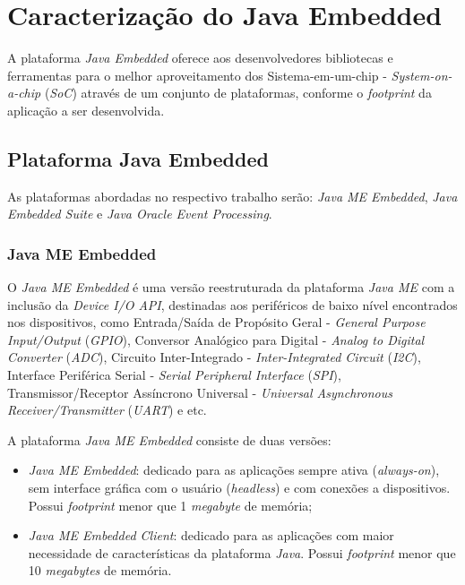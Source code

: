 %

\chapter{Caracterização do Java Embedded}

A plataforma \textit{Java Embedded} oferece aos desenvolvedores bibliotecas e 
ferramentas para o melhor aproveitamento dos Sistema-em-um-chip - 
\textit{System-on-a-chip} (\textit{SoC}) através de um conjunto de plataformas, 
conforme o \textit{footprint} da aplicação a ser desenvolvida.

\section{Plataforma Java Embedded}

As plataformas abordadas no respectivo trabalho serão: \textit{Java ME 
Embedded}, \textit{Java Embedded Suite} e \textit{Java Oracle Event Processing}.

\subsection{Java ME Embedded}

O \textit{Java ME Embedded} é uma versão reestruturada da plataforma 
\textit{Java ME} com a inclusão da \textit{Device I/O API}, destinadas aos 
periféricos de baixo nível encontrados nos dispositivos, como Entrada/Saída de 
Propósito Geral - \textit{General Purpose Input/Output} (\textit{GPIO}), 
Conversor Analógico para Digital - \textit{Analog to Digital Converter} 
(\textit{ADC}), Circuito Inter-Integrado - \textit{Inter-Integrated Circuit} 
(\textit{I2C}), Interface Periférica Serial - \textit{Serial Peripheral 
Interface} (\textit{SPI}), Transmissor/Receptor Assíncrono Universal - 
\textit{Universal Asynchronous Receiver/Transmitter} (\textit{UART}) e etc.

A plataforma \textit{Java ME Embedded} consiste de duas versões:

\begin{itemize}
    
    \item \textit{Java ME Embedded}: dedicado para as aplicações sempre ativa 
    (\textit{always-on}), sem interface gráfica com o usuário 
    (\textit{headless}) e com conexões a dispositivos. Possui 
    \textit{footprint} menor que 1 \textit{megabyte} de memória;
    
    \item \textit{Java ME Embedded Client}: dedicado para as aplicações com 
    maior necessidade de características da plataforma \textit{Java}. Possui 
    \textit{footprint} menor que 10 \textit{megabytes} de memória.
    
\end{itemize}

